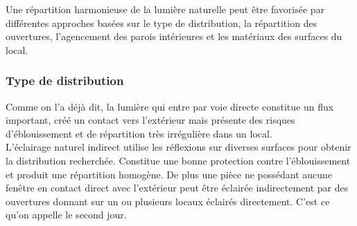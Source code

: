 \documentclass[11pt]{report}
\begin{document}
Une répartition harmonieuse de la lumière naturelle peut être favorisée par différentes approches basées sur le type de distribution, la répartition des ouvertures, l'agencement des parois intérieures et les matériaux des surfaces du local.



\subsubsection{Type de distribution}
Comme on l'a déjà dit, la lumière qui entre par voie directe constitue un flux important, créé un contact vers l'extérieur mais présente des risques d'éblouissement et de répartition très irrégulière dans un local.\\

L'éclairage naturel indirect utilise les réflexions sur diverses surfaces pour obtenir la distribution recherchée. Constitue une bonne protection contre l'éblouissement et produit une répartition homogène.
De plus une pièce ne possédant aucune fenêtre en contact direct avec l'extérieur peut être éclairée indirectement par des ouvertures donnant sur un ou plusieurs locaux éclairés directement. C'est ce qu'on appelle le second jour.
\end{document}
